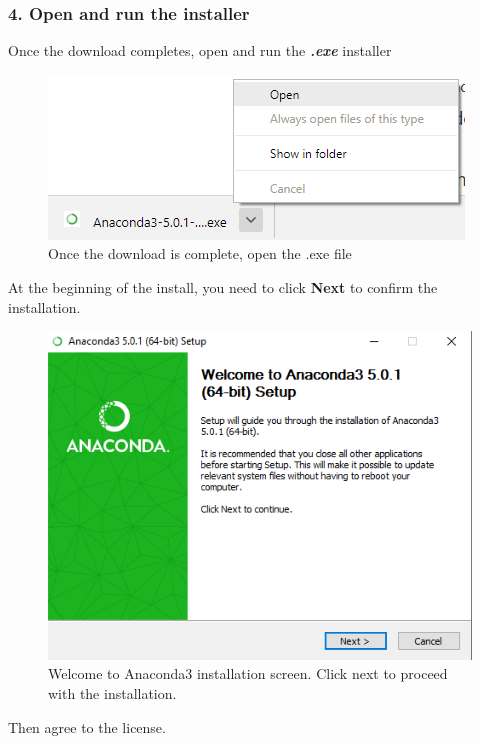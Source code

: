 \documentclass{book}
\makeatletter
\def\maxwidth{\ifdim\Gin@nat@width>\linewidth\linewidth
    \else\Gin@nat@width\fi}
\let\Oldincludegraphics\includegraphics
\renewcommand{\includegraphics}[1]{\Oldincludegraphics[width=.8\maxwidth]{#1}}
\makeatother
\begin{document}
    
        \subsubsection{4. Open and run the
installer}\label{open-and-run-the-installer}

Once the download completes, open and run the \textbf{\emph{.exe}}
installer

\begin{figure}
\centering
\includegraphics{images/anaconda_run_installer.png}
\caption{Once the download is complete, open the .exe file}
\end{figure}

At the beginning of the install, you need to click \textbf{Next} to
confirm the installation.

\begin{figure}
\centering
\includegraphics{images/anaconda_installer_click_next.png}
\caption{Welcome to Anaconda3 installation screen. Click next to proceed
with the installation.}
\end{figure}

Then agree to the license.
\end{document}
